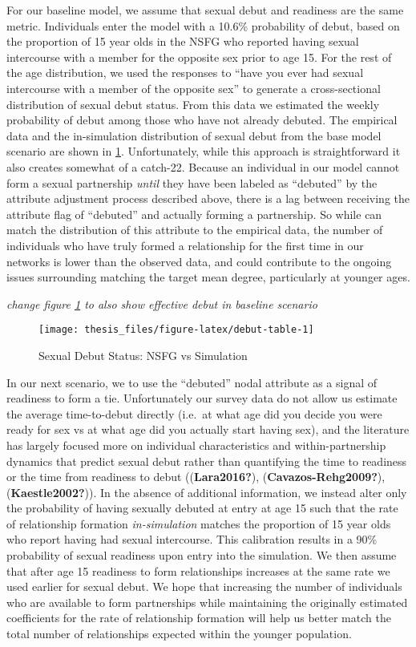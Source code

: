 \documentclass [11pt, proquest] {uwthesis}[2015/03/03]
\begin{document}
For our baseline model, we assume that sexual debut and readiness are the same metric. Individuals enter the model with a 10.6\% probability of debut, based on the proportion of 15 year olds in the NSFG who reported having sexual intercourse with a member for the opposite sex prior to age 15. For the rest of the age distribution, we used the responses to ``have you ever had sexual intercourse with a member of the opposite sex'' to generate a cross-sectional distribution of sexual debut status. From this data we estimated the weekly probability of debut among those who have not already debuted. The empirical data and the in-simulation distribution of sexual debut from the base model scenario are shown in \ref{fig:debut-table}. Unfortunately, while this approach is straightforward it also creates somewhat of a catch-22. Because an individual in our model cannot form a sexual partnership \emph{until} they have been labeled as ``debuted'' by the attribute adjustment process described above, there is a lag between receiving the attribute flag of ``debuted'' and actually forming a partnership. So while can match the distribution of this attribute to the empirical data, the number of individuals who have truly formed a relationship for the first time in our networks is lower than the observed data, and could contribute to the ongoing issues surrounding matching the target mean degree, particularly at younger ages.

\emph{change figure \ref{fig:debut-table} to also show effective debut in baseline scenario}
\begin{figure}

{\centering \texttt{[image: thesis\_files/figure-latex/debut-table-1]} 

}

\caption{Sexual Debut Status: NSFG vs Simulation}\label{fig:debut-table}
\end{figure}
In our next scenario, we to use the ``debuted'' nodal attribute as a signal of readiness to form a tie. Unfortunately our survey data do not allow us estimate the average time-to-debut directly (i.e.~at what age did you decide you were ready for sex vs at what age did you actually start having sex), and the literature has largely focused more on individual characteristics and within-partnership dynamics that predict sexual debut rather than quantifying the time to readiness or the time from readiness to debut ((\textbf{Lara2016?}), (\textbf{Cavazos-Rehg2009?}), (\textbf{Kaestle2002?})). In the absence of additional information, we instead alter only the probability of having sexually debuted at entry at age 15 such that the rate of relationship formation \emph{in-simulation} matches the proportion of 15 year olds who report having had sexual intercourse. This calibration results in a 90\% probability of sexual readiness upon entry into the simulation. We then assume that after age 15 readiness to form relationships increases at the same rate we used earlier for sexual debut. We hope that increasing the number of individuals who are available to form partnerships while maintaining the originally estimated coefficients for the rate of relationship formation will help us better match the total number of relationships expected within the younger population.
\end{document}
